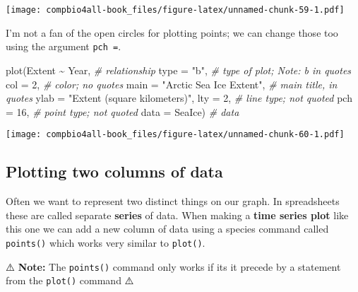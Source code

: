 \documentclass[
]{book}
\newenvironment{Shaded}{\begin{snugshade}}{\end{snugshade}}
\newcommand{\AttributeTok}[1]{\textcolor[rgb]{0.77,0.63,0.00}{#1}}
\newcommand{\CommentTok}[1]{\textcolor[rgb]{0.56,0.35,0.01}{\textit{#1}}}
\newcommand{\DecValTok}[1]{\textcolor[rgb]{0.00,0.00,0.81}{#1}}
\newcommand{\FunctionTok}[1]{\textcolor[rgb]{0.00,0.00,0.00}{#1}}
\newcommand{\NormalTok}[1]{#1}
\newcommand{\SpecialCharTok}[1]{\textcolor[rgb]{0.00,0.00,0.00}{#1}}
\newcommand{\StringTok}[1]{\textcolor[rgb]{0.31,0.60,0.02}{#1}}
\begin{document}
\texttt{[image: compbio4all-book\_files/figure-latex/unnamed-chunk-59-1.pdf]}

I'm not a fan of the open circles for plotting points; we can change those too using the argument \texttt{pch\ =}.

\begin{Shaded}
\begin{Highlighting}[]
\FunctionTok{plot}\NormalTok{(Extent }\SpecialCharTok{\textasciitilde{}}\NormalTok{ Year,  }\CommentTok{\# relationship}
     \AttributeTok{type =} \StringTok{"b"}\NormalTok{,     }\CommentTok{\# type of plot; Note: b in quotes}
     \AttributeTok{col =} \DecValTok{2}\NormalTok{,        }\CommentTok{\# color; no quotes}
     \AttributeTok{main =} \StringTok{"Arctic Sea Ice Extent"}\NormalTok{, }\CommentTok{\# main title, in quotes}
     \AttributeTok{ylab =} \StringTok{"Extent (square kilometers)"}\NormalTok{,}
     \AttributeTok{lty =} \DecValTok{2}\NormalTok{,        }\CommentTok{\# line type; not quoted}
     \AttributeTok{pch =} \DecValTok{16}\NormalTok{,       }\CommentTok{\# point type; not quoted}
     \AttributeTok{data =}\NormalTok{ SeaIce)  }\CommentTok{\# data}
\end{Highlighting}
\end{Shaded}

\texttt{[image: compbio4all-book\_files/figure-latex/unnamed-chunk-60-1.pdf]}

\hypertarget{plotting-two-columns-of-data}{%
\subsection{Plotting two columns of data}\label{plotting-two-columns-of-data}}

Often we want to represent two distinct things on our graph. In spreadsheets these are called separate \textbf{series} of data. When making a \textbf{time series plot} like this one we can add a new column of data using a species command called \texttt{points()} which works very similar to \texttt{plot()}.

⚠️ \textbf{Note:} The \texttt{points()} command only works if its it precede by a statement from the \texttt{plot()} command ⚠️
\end{document}
